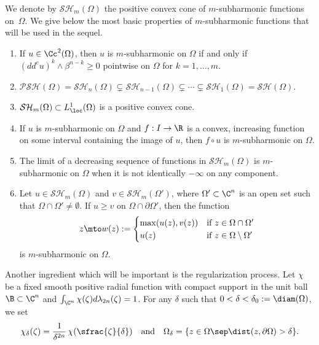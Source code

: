 We denote by $\mathcal{SH}_m (\Omega) $ the positive convex cone of $m$-subharmonic functions on~$\Omega$. We give below the most basic properties of $m$-subharmonic functions that will be used in the sequel.

\skpt
\begin{proposition}\label{prop:basic}
\begin{enumerate}
\item
If $u\in \Cc^2(\Omega)$, then $u$ is $m$-subharmonic on $\Omega$ if and only if $(dd^c u)^k\wedge \beta^{n-k}\geq0$
pointwise on $\Omega$ for $k=1,\dots, m$.

\item
$\mathcal{PSH}(\Omega)=\mathcal{SH}_n(\Omega)\subsetneq \mathcal{SH}_{n-1}(\Omega)\subsetneq\cdots\subsetneq \mathcal{SH}_1(\Omega)=\mathcal{SH}(\Omega) $.

\item
$\mathcal{SH}_m(\Omega) \subset L^1_{\loc} (\Omega)$ is a positive convex cone.

\item
If $u$ is $m$-subharmonic on $\Omega$ and $f: I \to\R$ is a convex, increasing function on some interval containing the image of $u$, then $f\circ u$ is $m$-subharmonic on $\Omega$.

\item
The limit of a decreasing sequence of functions in $\mathcal{SH}_m(\Omega)$ is $m$-subharmonic on $\Omega$ when it is not identically $- \infty$ on any component.

\item
Let $u \in \mathcal{SH}_m(\Omega)$ and $v \in \mathcal{SH}_m(\Omega') $, where $\Omega'\subset\C^n$ is an open set such that $\Omega \cap \Omega' \neq \emptyset$. If $u\geq v$ on $\Omega \cap \partial\Omega'$, then the function
\[
z \mto w(z):=\begin{cases}
\max(u(z),v(z)) &\text{if } z \in \Omega \cap \Omega'\\
u(z) &\hbox{if } z \in\Omega\setminus\Omega'
\end{cases}
\]
is $m$-subharmonic on $\Omega$.
\end{enumerate}
\end{proposition}

Another ingredient which will be important is the regularization process. Let $\chi$ be a fixed smooth positive radial function with compact support in the unit ball $\B \subset \C^n$ and $\int_{\C^n}\chi (\zeta)d\lambda_{2 n}(\zeta)=1$.
For any $\delta$ such that $ 0 < \delta < \delta_0:= \diam (\Omega)$, we set
\[
\chi_{\delta}(\zeta)=\frac{1}{\delta^{2n}}\,\chi (\sfrac{\zeta}{\delta})\quad\text{and}\quad \Omega_{\delta}=\{z \in\Omega\sep \dist (z,\partial\Omega)>\delta\}.
\]

